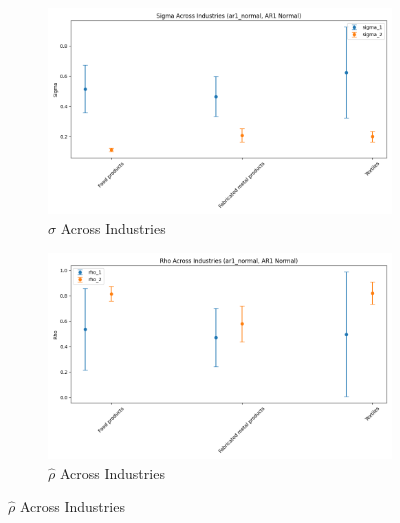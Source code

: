 \documentclass{article}
\begin{document}
\begin{figure}[ht!]
\begin{subfigure}[t]{0.32\textwidth}
        \includegraphics[width=\textwidth]{figure/ar1_normal_sigma_across_industries.png}
        \caption{$\hat\sigma$ Across Industries}
    \end{subfigure}
    \begin{subfigure}[t]{0.32\textwidth}
        \centering
        \includegraphics[width=\textwidth]{figure/ar1_normal_rho_across_industries.png}
        \caption{$\hat\rho$ Across Industries}
    \end{subfigure}
\end{figure}
\end{document}
